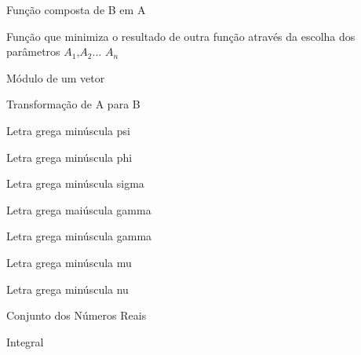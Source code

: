 
\begin{simbolos}
  \item[$ A \circ B $] Função composta de B em A
  \item[$ \underset{A_1, A_2 ... A_n}{argmin}$] Função que minimiza o resultado de outra função através da escolha dos parâmetros $A_1$,$A_2$... $A_n$
  \item[$ \left\|\; \right\|^2 $] Módulo de um vetor 
  \item[$ A\to B$] Transformação de A para B
  \item[$ \psi $] Letra grega minúscula psi
  \item[$ \phi$] Letra grega minúscula phi
  \item[$\sigma$] Letra grega minúscula sigma
  \item[$\Gamma$] Letra grega maiúscula gamma
  \item[$\gamma$] Letra grega minúscula gamma
  \item[$\mu$] Letra grega minúscula mu
  \item[$\nu$] Letra grega minúscula nu
  \item[$\mathbb {R}$] Conjunto dos Números Reais
  \item[$\int $] Integral
\end{simbolos}